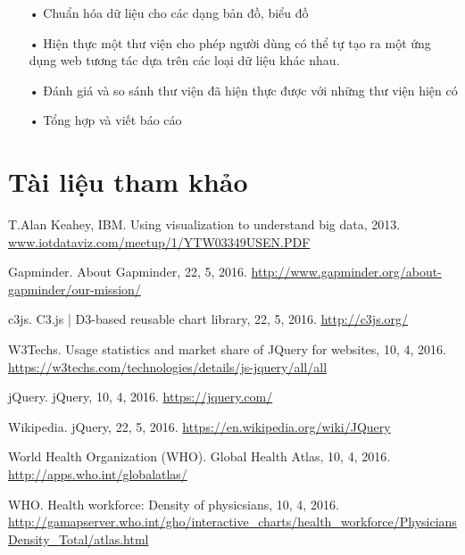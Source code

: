 \documentclass[12pt,a4paper,oneside]{article}
\begin{document}
\begin{itemize}
\item[•]Chuẩn hóa dữ liệu cho các dạng bản đồ, biểu đồ

\item[•]Hiện thực một thư viện cho phép người dùng có thể tự tạo ra một ứng dụng web tương tác dựa trên các loại dữ liệu khác nhau.

\item[•]Đánh giá và so sánh thư viện đã hiện thực được với những thư viện hiện có

\item[•]Tổng hợp và viết báo cáo

\end{itemize}
\section{Tài liệu tham khảo}
\begin{thebibliography}{}

 T.Alan Keahey, IBM. Using visualization to understand big data, 2013. \url{www.iotdataviz.com/meetup/1/YTW03349USEN.PDF}

 Gapminder. About Gapminder, 22, 5, 2016. \url{http://www.gapminder.org/about-gapminder/our-mission/}

 c3js. C3.js | D3-based reusable chart library, 22, 5, 2016. \url{http://c3js.org/}

 W3Techs. Usage statistics and market share of JQuery for websites, 10, 4, 2016. \url{https://w3techs.com/technologies/details/js-jquery/all/all}

 jQuery. jQuery, 10, 4, 2016. \url{https://jquery.com/}

 Wikipedia. jQuery, 22, 5, 2016. \url{https://en.wikipedia.org/wiki/JQuery}

 World Health Organization (WHO). Global Health Atlas, 10, 4, 2016. \url{http://apps.who.int/globalatlas/}

 WHO. Health workforce: Density of physicsians, 10, 4, 2016. \url{http://gamapserver.who.int/gho/interactive_charts/health_workforce/PhysiciansDensity_Total/atlas.html}


\end{thebibliography}
\end{document}

